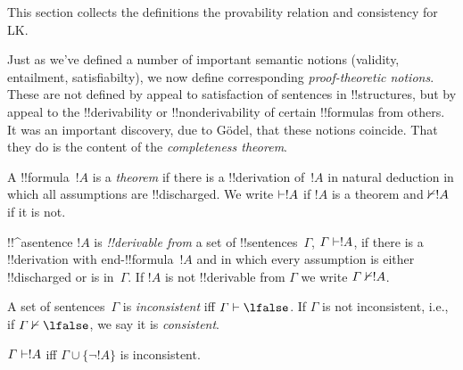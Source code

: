 \documentclass[../../../include/open-logic-section]{subfiles}
\begin{document}

\begin{editorial}
This section collects the definitions the provability relation
and consistency for LK.
\end{editorial}

\begin{explain}
Just as we've defined a number of important semantic notions
(validity, entailment, satisfiabilty), we now define corresponding
\emph{proof-theoretic notions}.  These are not defined by appeal to
satisfaction of sentences in !!{structure}s, but by appeal to the
!!{derivability} or !!{nonderivability} of certain !!{formula}s from
others.  It was an important discovery, due to G\"odel, that these
notions coincide.  That they do is the content of the
\emph{completeness theorem}.
\end{explain}


\begin{defn}[Theorems]
A !!{formula}~$!A$ is a \emph{theorem} if there is a !!{derivation}
of~$!A$ in natural deduction in which all assumptions are
!!{discharged}.  We write $\Proves !A$ if $!A$ is a theorem and
$\Proves/ !A$ if it is not.
\end{defn}

\begin{defn}[!!^{derivability}]
!!^a{sentence} $!A$ is \emph{!!{derivable} from} a set of
!!{sentence}s~$\Gamma$, $\Gamma \Proves !A$, if there is a
!!{derivation} with end-!!{formula}~$!A$ and in which every assumption
is either !!{discharged} or is in~$\Gamma$. If $!A$ is not
!!{derivable} from $\Gamma$ we write $\Gamma \Proves/ !A$.
\end{defn}

\begin{defn}[Consistency]
A set of sentences~$\Gamma$ is \emph{inconsistent} iff $\Gamma
\Proves \lfalse$.  If $\Gamma$ is not inconsistent, i.e., if
$\Gamma \Proves/ \lfalse$, we say it is \emph{consistent}.
\end{defn}

\begin{prop}
$\Gamma \Proves !A$ iff $\Gamma \cup \{\lnot !A\}$ is inconsistent.
\end{prop}
\end{document}
